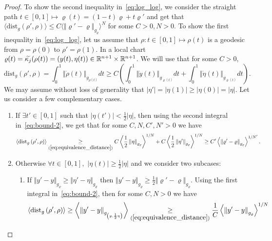 \documentclass[10pt]{amsart}
\theoremstyle{definition}\newtheorem{defi}[theo]{Definition}\newtheorem{rema}[theo]{Remark}\newtheorem{exam}[theo]{Example}\newtheorem{exem}[theo]{Example}\newtheorem{nota}[theo]{Notation}
\newcommand*\ineqs[1]{\underset{(#1)}{\geq}}
\newcommand{\dist}{\mathrm{dist}}
\newcommand{\bbR}{\mathbb{R}}
\let\oldtilde\tilde
\renewcommand*{\tilde}[1]{\mathchoice{\widetilde{#1}}{\widetilde{#1}}{\oldtilde{#1}}{\oldtilde{#1}}}
\let\oldexists\exists
\renewcommand*{\exists}{\mathrel{\oldexists}}
\let\oldforall\forall
\renewcommand*{\forall}{\mathrel{\oldforall}}
\begin{document}
\begin{proof}
To show the second inequality in~\eqref{eq:log_log}, we consider the straight path $t\in[0,1]\mapsto\varrho(t)=(1-t)\varrho+t\varrho'$ and get that $\langle \dist_{g}(\rho',\rho)\rangle \leq C\langle \Vert \varrho'-\varrho\Vert _{g_{\varrho}}\rangle^{N}$ for some $C>0,N>0$. To show the first inequality in~\eqref{eq:log_log}, let us assume that $\rho:t\in[0,1]\mapsto\rho(t)$ is a geodesic from $\rho=\rho(0)$ to $\rho'=\rho(1)$. In a local chart $\varrho(t)=\tilde{\kappa_{j}}(\rho(t))=(y(t),\eta(t))\in\bbR^{n+1}\times\bbR^{n+1}$. We will use that for some $C>0$,
\begin{equation}\label{eq:bound-2}
\dist_{g}\left(\rho',\rho\right)
=\int_{0}^{1}\left\Vert \dot{\rho}\left(t\right)\right\Vert _{g_{\rho\left(t\right)}}dt
\geq C\left(\int_{0}^{1}\left\Vert \dot{y}\left(t\right)\right\Vert _{g_{\varrho\left(t\right)}}dt+\int_{0}^{1}\left\Vert \dot{\eta}\left(t\right)\right\Vert _{g_{\varrho\left(t\right)}}dt\right).
\end{equation}
We may assume without loss of generality that $|\eta'|=|\eta(1)|\geq|\eta(0)|=|\eta|$. Let us consider a few complementary cases.
\begin{enumerate}
\item If $\exists t'\in[0,1]$ such that $|\eta(t')|<\frac{1}{2}|\eta|$, then using the second integral in~\eqref{eq:bound-2}, we get that for some $C,N,C',N'>0$ we have
\[
\left\langle \dist_{g}\left(\rho',\rho\right)\right\rangle \ineqs{\ref{eq:equivalence_distance}}C\left\langle \frac{1}{2}\left\Vert \eta\right\Vert _{g_{\varrho}}\right\rangle ^{1/N}+C\left\langle \frac{1}{2}\left\Vert \eta'\right\Vert _{g_{\varrho}}\right\rangle ^{1/N}\geq C'\left\langle \left\Vert \varrho'-\varrho\right\Vert _{g_{\varrho}}\right\rangle ^{1/N'}.
\]
\item Otherwise $\forall t\in[0,1],$ $|\eta(t)|\geq\frac{1}{2}|\eta|$ and we consider two subcases:
\begin{enumerate}
\item If $\Vert y'-y\Vert _{g_{\varrho}}\geq\Vert \eta'-\eta\Vert _{g_{\varrho}}$ then $\Vert y'-y\Vert _{g_{\varrho}}\geq\frac{1}{2}\Vert \varrho'-\varrho\Vert _{g_{\varrho}}$. Using the first integral in~\eqref{eq:bound-2}, then for some $C,N>0$ we have
\begin{align*}
\left\langle \dist_{g}\left(\rho',\rho\right)\right\rangle & \geq\left\langle \left\Vert y'-y\right\Vert _{g_{\left(y,\frac{1}{2}\eta\right)}}\right\rangle \ineqs{\ref{eq:equivalence_distance}}\frac{1}{C}\left\langle \left\Vert y'-y\right\Vert _{g_{\varrho}}\right\rangle ^{1/N}\\

\end{align*}
\end{enumerate}
\end{enumerate}
\end{proof}
\end{document}
